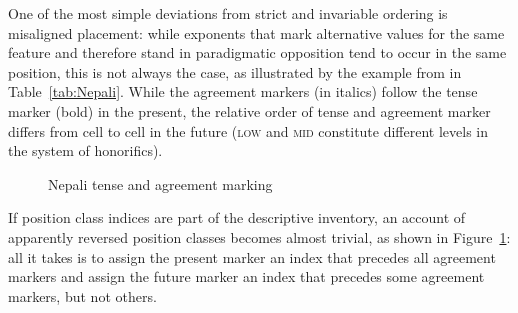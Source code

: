 \documentclass[output=paper,biblatex,babelshorthands,newtxmath,draftmode,colorlinks,citecolor=brown]{langscibook}
\begin{document}
\begin{exe}
\begin{xlist}
\begin{exe}
\begin{xlist}
\largerpage
\enlargethispage{5pt}
One of the most simple deviations from strict and invariable ordering
is misaligned placement: while exponents that mark alternative values
for the same feature and therefore stand in paradigmatic opposition
tend to occur in the same position, this is not always the case, as
illustrated by the example from  in Table~\ref{tab:Nepali}.  
While the agreement markers (in italics) follow the tense marker (bold) in the present,
the relative order of tense and agreement marker differs from cell to
cell in the future (\textsc{low} and \textsc{mid} constitute
different levels in the system of honorifics).

\begin{figure}
  \centering
{}
    \caption{Nepali tense and agreement marking}\label{fig:AnalysisNepali}
\end{figure}

If position class indices are part of the descriptive inventory, an
account of apparently reversed position classes \citep{Stump93}
becomes almost trivial, as shown in Figure~\ref{fig:AnalysisNepali}:
all it takes is to assign the present marker an index that precedes
all agreement markers and assign the future marker an index that
precedes some agreement markers, but not others.


\end{xlist}
\end{exe}
\end{xlist}
\end{exe}
\end{document}
